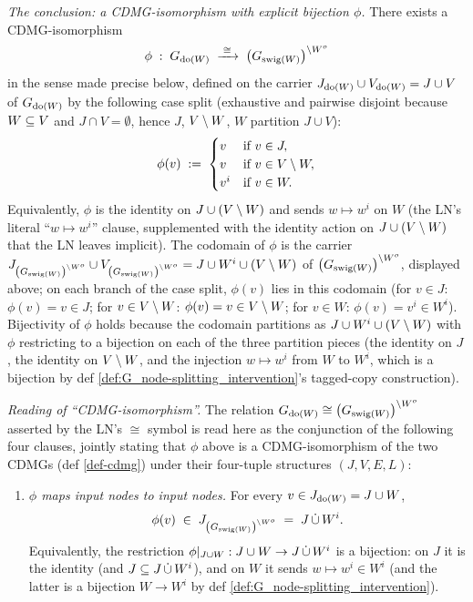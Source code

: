 \documentclass[main]{subfiles}
\begin{document}
\begin{Lem}
    \emph{The conclusion: a CDMG-isomorphism with explicit bijection $\phi$.}
    There exists a CDMG-isomorphism
    \[
        \phi \;:\; G_{\operatorname{do}(W)} \;\xrightarrow{\;\cong\;}\; \left ( G_{\mathrm{swig}(W)} \right )^{\setminus W^o}
    \]
    in the sense made precise below, defined on the carrier $J_{\operatorname{do}(W)} \cup V_{\operatorname{do}(W)} = J \cup V$ of $G_{\operatorname{do}(W)}$ by the following case split (exhaustive and pairwise disjoint because $W \subseteq V$ and $J \cap V = \emptyset$, hence $J$, $V \setminus W$, $W$ partition $J \cup V$):
    \[
        \phi(v) \;:=\;
        \begin{cases}
            v & \text{if } v \in J, \\
            v & \text{if } v \in V \setminus W, \\
            v^i & \text{if } v \in W.
        \end{cases}
    \]
    Equivalently, $\phi$ is the identity on $J \cup (V \setminus W)$ and sends $w \mapsto w^i$ on $W$ (the LN's literal ``$w \mapsto w^i$'' clause, supplemented with the identity action on $J \cup (V \setminus W)$ that the LN leaves implicit). The codomain of $\phi$ is the carrier $J_{\left ( G_{\mathrm{swig}(W)} \right )^{\setminus W^o}} \cup V_{\left ( G_{\mathrm{swig}(W)} \right )^{\setminus W^o}} = J \cup W^i \cup (V \setminus W)$ of $\left ( G_{\mathrm{swig}(W)} \right )^{\setminus W^o}$, displayed above; on each branch of the case split, $\phi(v)$ lies in this codomain (for $v \in J$: $\phi(v) = v \in J$; for $v \in V \setminus W$: $\phi(v) = v \in V \setminus W$; for $v \in W$: $\phi(v) = v^i \in W^i$). Bijectivity of $\phi$ holds because the codomain partitions as $J \cup W^i \cup (V \setminus W)$ with $\phi$ restricting to a bijection on each of the three partition pieces (the identity on $J$, the identity on $V \setminus W$, and the injection $w \mapsto w^i$ from $W$ to $W^i$, which is a bijection by def \ref{def:G_node-splitting_intervention}'s tagged-copy construction).

    \emph{Reading of ``CDMG-isomorphism''.}
    The relation $G_{\operatorname{do}(W)} \cong \left ( G_{\mathrm{swig}(W)} \right )^{\setminus W^o}$ asserted by the LN's $\cong$ symbol is read here as the conjunction of the following four clauses, jointly stating that $\phi$ above is a CDMG-isomorphism of the two CDMGs (def \ref{def-cdmg}) under their four-tuple structures $(J, V, E, L)$:
    \begin{enumerate}[label=(\alph*)]
        \item \emph{$\phi$ maps input nodes to input nodes.}
              For every $v \in J_{\operatorname{do}(W)} = J \cup W$,
              \[
                  \phi(v) \;\in\; J_{\left ( G_{\mathrm{swig}(W)} \right )^{\setminus W^o}} \;=\; J \,\dot{\cup}\, W^i.
              \]
              Equivalently, the restriction $\phi\rvert_{J \cup W} : J \cup W \to J \,\dot{\cup}\, W^i$ is a bijection: on $J$ it is the identity (and $J \subseteq J \,\dot{\cup}\, W^i$), and on $W$ it sends $w \mapsto w^i \in W^i$ (and the latter is a bijection $W \to W^i$ by def \ref{def:G_node-splitting_intervention}).


\end{enumerate}
\end{Lem}
\end{document}

